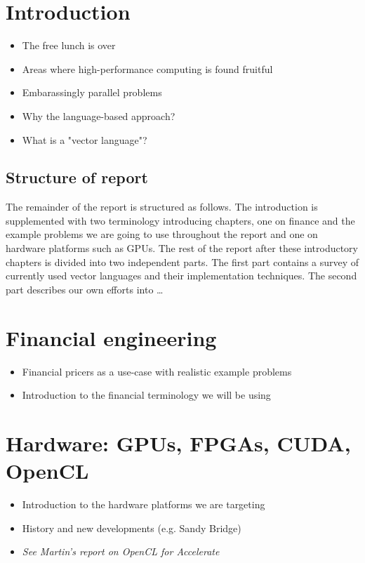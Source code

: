 \chapter{Introduction}
\begin{itemize}
\item The free lunch is over
\item Areas where high-performance computing is found fruitful
\item Embarassingly parallel problems
\item Why the language-based approach?
\item What is a "vector language"?
\end{itemize}

\section{Structure of report}
The remainder of the report is structured as follows. The introduction
is supplemented with two terminology introducing chapters, one on
finance and the example problems we are going to use throughout the
report and one on hardware platforms such as GPUs. The rest of the
report after these introductory chapters is divided into two
independent parts. The first part contains a survey of currently used
vector languages and their implementation techniques. The second part
describes our own efforts into \ldots

\chapter{Financial engineering}
\begin{itemize}
\item Financial pricers as a use-case with realistic example problems
\item Introduction to the financial terminology we will be using
\end{itemize}

\chapter{Hardware: GPUs, FPGAs, CUDA, OpenCL}
\begin{itemize}
\item Introduction to the hardware platforms we are targeting
\item History and new developments (e.g. Sandy Bridge)
\item \textit{See Martin's report on OpenCL for Accelerate}
\end{itemize}


